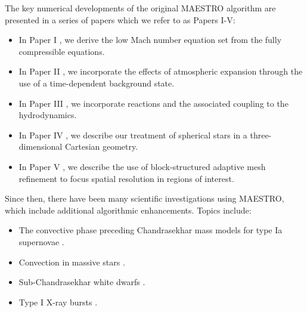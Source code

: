 The key numerical developments of the original MAESTRO algorithm are presented in a series of papers which we refer to as Papers I-V:
\begin{itemize}
\item In Paper I \citep{MAESTRO_I}, we derive the low Mach number equation set from the fully compressible equations.
\item In Paper II \citep{MAESTRO_II}, we incorporate the effects of atmospheric expansion through the use of a time-dependent background state.
\item In Paper III \citep{MAESTRO_III}, we incorporate reactions and the associated coupling to the hydrodynamics.
\item In Paper IV \citep{MAESTRO_IV}, we describe our treatment of spherical stars in a three-dimensional Cartesian geometry.
\item In Paper V \citep{MAESTRO_V}, we describe the use of block-structured adaptive mesh refinement to focus spatial resolution in regions of interest.
\end{itemize}

Since then, there have been many scientific investigations using MAESTRO, which include additional algorithmic enhancements.  Topics include:
\begin{itemize}
\item The convective phase preceding Chandrasekhar mass models for type Ia supernovae \citep{MAESTRO_convection,MAESTRO_AMR,MAESTRO_CASTRO}.
\item Convection in massive stars \citep{Gilet:2013}.
\item Sub-Chandrasekhar white dwarfs \citep{subChandra_I,subChandra_II}.
\item Type I X-ray bursts \citep{XRB_I,XRB_II,XRB_III}.
\end{itemize}

